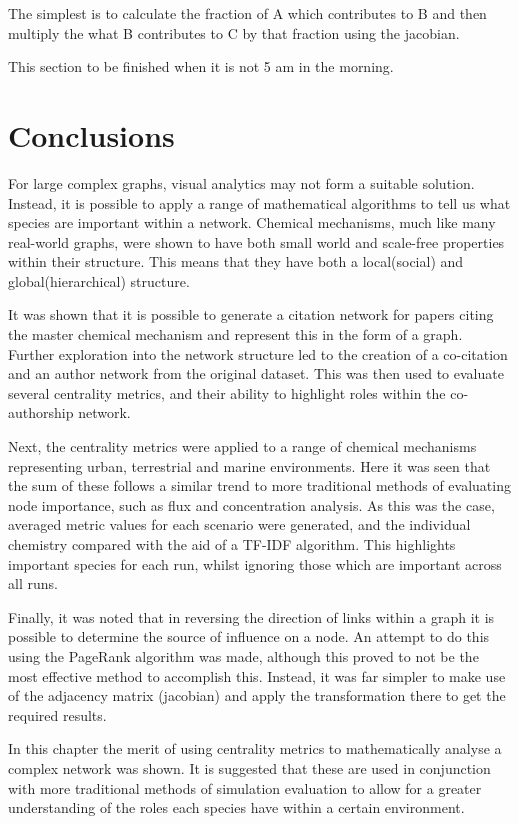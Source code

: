 The simplest is to calculate the fraction of A which contributes to B and then multiply the what B contributes to C by that fraction using the jacobian.

This section to be finished when it is not 5 am in the morning. 

\section{Conclusions}
For large complex graphs, visual analytics may not form a suitable solution. Instead, it is possible to apply a range of mathematical algorithms to tell us what species are important within a network. Chemical mechanisms, much like many real-world graphs, were shown to have both small world and scale-free properties within their structure. This means that they have both a local(social) and global(hierarchical) structure. 

It was shown that it is possible to generate a citation network for papers citing the master chemical mechanism and represent this in the form of a graph. Further exploration into the network structure led to the creation of a co-citation and an author network from the original dataset. This was then used to evaluate several centrality metrics, and their ability to highlight roles within the co-authorship network. 

Next, the centrality metrics were applied to a range of chemical mechanisms representing urban, terrestrial and marine environments. Here it was seen that the sum of these follows a similar trend to more traditional methods of evaluating node importance, such as flux and concentration analysis. As this was the case, averaged metric values for each scenario were generated, and the individual chemistry compared with the aid of a TF-IDF algorithm. This highlights important species for each run, whilst ignoring those which are important across all runs.

Finally, it was noted that in reversing the direction of links within a graph it is possible to determine the source of influence on a node. An attempt to do this using the PageRank algorithm was made, although this proved to not be the most effective method to accomplish this. Instead, it was far simpler to make use of the adjacency matrix (jacobian) and apply the transformation there to get the required results. 

In this chapter the merit of using centrality metrics to mathematically analyse a complex network was shown. It is suggested that these are used in conjunction with more traditional methods of simulation evaluation to allow for a greater understanding of the roles each species have within a certain environment. 

